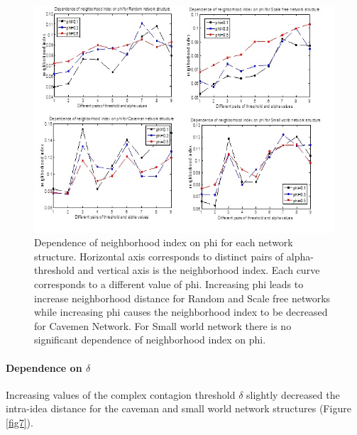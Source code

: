 \begin{figure}
[htp]
\begin{center}
\includegraphics{Fig6}
\end{center}
\caption{Dependence of neighborhood index on phi for each network structure. Horizontal axis corresponds to distinct pairs of alpha-threshold and   vertical axis is the neighborhood index. Each curve corresponds to a different value of phi. Increasing phi leads to increase neighborhood distance for Random and Scale free networks while increasing phi causes the neighborhood index to be decreased for Cavemen Network. For Small world network there is no significant dependence of neighborhood index on phi.}
\label {fig6}
\end{figure}

\paragraph{Dependence on $\delta$}
Increasing values of the complex contagion threshold $\delta$ slightly decreased the intra-idea distance for the caveman and small world network structures (Figure \ref{fig7}). 

